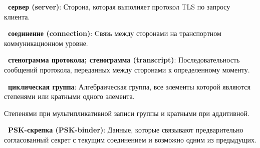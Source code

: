 {\bf \thedefctr~сервер (server)}:
Сторона, которая выполняет протокол TLS по запросу клиента.


{\bf \thedefctr~соединение (connection)}:
Cвязь между сторонами на транспортном коммуникационном уровне. 


{\bf \thedefctr~стенограмма протокола; стенограмма (transcript)}: 
Последовательность сообщений протокола, переданных между сторонами к 
определенному моменту.

{\bf \thedefctr~циклическая группа}:
Алгебраическая группа, все элементы которой являются степенями или кратными
одного элемента.

\begin{note*}
Степенями при мультипликативной записи группы и кратными при аддитивной.
\end{note*}

{\bf \thedefctr~PSK-скрепка (PSK-binder)}:
Данные, которые связывают предварительно согласованный секрет с текущим 
соединением и возможно одним из предыдущих.

